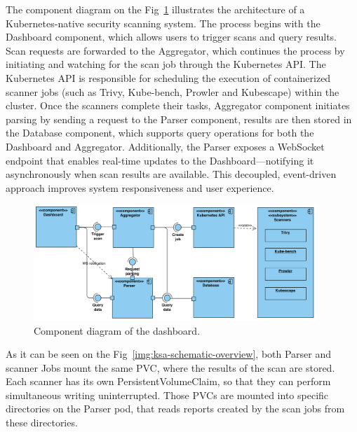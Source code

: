 The component diagram on the Fig~\ref{img:ksa-component-diagram} illustrates the architecture of a Kubernetes-native security scanning system. The process begins with the Dashboard component, which allows users to trigger scans and query results. Scan requests are forwarded to the Aggregator, which continues the process by initiating and watching for the scan job through the Kubernetes API. The Kubernetes API is responsible for scheduling the execution of containerized scanner jobs (such as Trivy, Kube-bench, Prowler and Kubescape) within the cluster. Once the scanners complete their tasks, Aggregator component initiates parsing by sending a request to the Parser component, results are then stored in the Database component, which supports query operations for both the Dashboard and Aggregator. Additionally, the Parser exposes a WebSocket endpoint that enables real-time updates to the Dashboard—notifying it asynchronously when scan results are available. This decoupled, event-driven approach improves system responsiveness and user experience.

\begin{figure}[!hbt]
	\begin{center}
		\includegraphics[width=0.95\textwidth]{images/ksa-component-diagram.png}
        \caption{Component diagram of the dashboard.}
		\label{img:ksa-component-diagram}
	\end{center}
\end{figure}

As it can be seen on the Fig~\ref{img:ksa-schematic-overview}, both Parser and scanner Jobs mount the same PVC, where the results of the scan are stored. Each scanner has its own PersistentVolumeClaim, so that they can perform simultaneous writing uninterrupted. Those PVCs are mounted into specific directories on the Parser pod, that reads reports created by the scan jobs from these directories.

